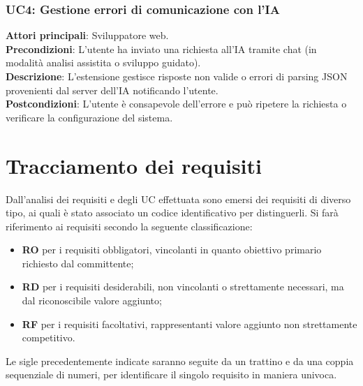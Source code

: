 \subsubsection*{UC4: Gestione errori di comunicazione con l’IA}
\noindent \textbf{Attori principali}: Sviluppatore web.\\
\textbf{Precondizioni}: L’utente ha inviato una richiesta all’IA tramite chat (in modalità analisi assistita o sviluppo guidato).\\
\textbf{Descrizione}: L’estensione gestisce risposte non valide o errori di parsing JSON provenienti dal server dell’IA notificando l’utente.\\
\textbf{Postcondizioni}: L’utente è consapevole dell’errore e può ripetere la richiesta o verificare la configurazione del sistema.\\



\section{Tracciamento dei requisiti}
\label{sec:req}
\noindent Dall’analisi dei requisiti e degli UC effettuata sono emersi dei requisiti di diverso tipo, ai quali è stato associato un codice identificativo per distinguerli. Si farà riferimento ai requisiti secondo la seguente classificazione:
\begin{itemize}
    \item \textbf{RO} per i requisiti obbligatori, vincolanti in quanto obiettivo primario richiesto dal committente;
    \item \textbf{RD} per i requisiti desiderabili, non vincolanti o strettamente necessari, ma dal riconoscibile valore aggiunto;
    \item \textbf{RF} per i requisiti facoltativi, rappresentanti valore aggiunto non strettamente competitivo.
\end{itemize}

\noindent Le sigle precedentemente indicate saranno seguite da un trattino e da una coppia sequenziale di numeri, per identificare il singolo requisito in maniera univoca.

